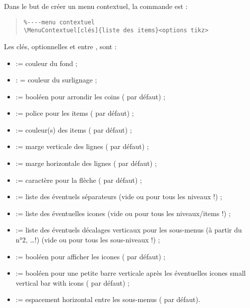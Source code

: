 \documentclass[11pt,a4paper]{ltxdoc}
\begin{document}
Dans le but de créer un menu contextuel, la commande est :

\begin{quote}
\begin{verbatim}
%----menu contextuel
\MenuContextuel[clés]{liste des items}<options tikz>
\end{verbatim}
\end{quote}

Les \textsf{clés}, optionnelles et entre \MontreCode{[...]}, sont :

\begin{itemize}
	\item {} := couleur du fond ;
	\item {} : = couleur du surlignage ;
	\item {} := booléen pour arrondir les coins ( par défaut) ;
	\item {} := police pour les items ( par défaut) ;
	\item {} := couleur(s) des items ( par défaut) ;
	\item {} := marge verticale des lignes (\MontreCode{6pt} par défaut) ;
	\item {} := marge horizontale des lignes (\MontreCode{12pt} par défaut) ;
	\item {} := caractère pour la flèche ( par défaut) ;
	\item {} := liste des éventuels séparateurs (vide ou pour tous les niveaux !) ;
	\item {} := liste des éventuelles icones  (vide ou pour tous les niveaux/items !) ;
	\item {} := liste des éventuels décalages verticaux pour les sous-menus (à partir du n°2, \ldots !) (vide ou pour tous les sous-niveaux !) ;
	\item {} := booléen pour afficher les icones ( par défaut) ;
	\item {} := booléen pour une petite barre verticale après les éventuelles icones small vertical bar with icons ( par défaut) ;
	\item {} := espacement horizontal entre les sous-menus ( par défaut).
\end{itemize}
\end{document}
